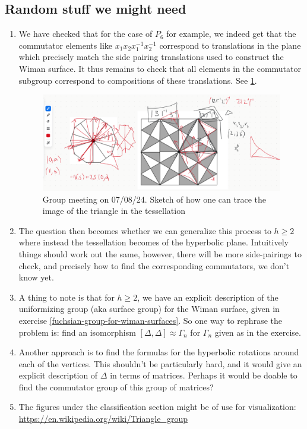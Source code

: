 \documentclass[reqno]{amsart}
\theoremstyle{definition}
\theoremstyle{remark}
\begin{document}
\newpage


\subsection{Random stuff we might need}
\begin{enumerate}
        \item We have checked that for the case of $P_6$ for example,
        we indeed get that the commutator elements like $x_1 x_2 x_1^{-1}
        x_2^{-1}$ correspond to translations in the plane which precisely
        match the side pairing translations used to construct the Wiman surface.
        It thus remains to check that all elements in the commutator
        subgroup correspond to compositions of these translations. 
        See \ref{fig:P_6-commutators}.
        \begin{figure}[http]
            \centering
            \includegraphics[width=1.2\linewidth]{P_6-commutators.png}
            \caption{Group meeting on 07/08/24. Sketch of how one can trace the image of the triangle
            in the tessellation}
            \label{fig:P_6-commutators}
        \end{figure}
        \item The question then becomes whether we can generalize this process
        to $h \geq 2$ where instead the tessellation becomes of the hyperbolic
        plane. Intuitively things should work out the same, however, there
        will be more side-pairings to check, and precisely how to find the
        corresponding commutators, we don't know yet. 
        \item A thing to note is that for $h \geq 2$, we have an explicit
        description of the uniformizing group (aka surface group) for
        the Wiman surface, given in exercise 
        \ref{fuchsian-group-for-wiman-surfaces}. So one way to rephrase the
        problem is: find an isomorphism $\left[\Delta, \Delta \right] 
        \approx \Gamma_n$ for $\Gamma_n$ given as in the exercise. 
        \item Another approach is to find the formulas for the hyperbolic
        rotations around each of the vertices. This shouldn't be particularly
        hard, and it would give an explicit description of $\Delta$ in
        terms of matrices. Perhaps it would be doable to find the commutator
        group of this group of matrices?
        \item The figures under the classification section might be of use for visualization: 
        \url{https://en.wikipedia.org/wiki/Triangle_group}
    \end{enumerate}
\end{document}
